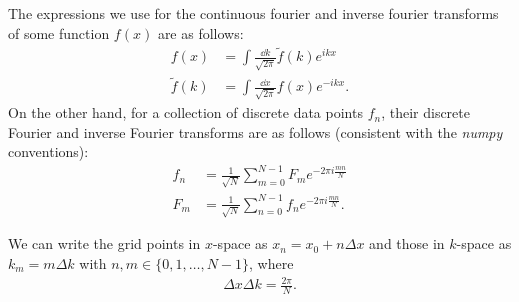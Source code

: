 The expressions we use for the continuous fourier and inverse fourier transforms of some function $f(x)$ are as follows:
\begin{align}
    f(x) &= \int \frac{\dd{k}}{\sqrt{2 \pi}} \tilde{f}(k) e^{i k x} \\
    \tilde{f}(k) &= \int \frac{\dd{x}}{\sqrt{2 \pi}} f(x) e^{-ikx}
.\end{align}
On the other hand, for a collection of discrete data points $f_{n}$, their discrete Fourier and inverse Fourier transforms are as follows (consistent with the \textit{numpy} conventions):
\begin{align}
    f_{n} &= \frac{1}{\sqrt{N}} \sum_{m=0}^{N-1} F_{m} e^{-2 \pi i \frac{m n}{N}} \\
    F_{m} &= \frac{1}{\sqrt{N}} \sum_{n=0}^{N-1} f_{n} e^{-2 \pi i \frac{m n}{N}}
.\end{align}

We can write the grid points in $x$-space as $x_{n} = x_0 + n \Delta x$ and those in $k$-space as $k_{m} = m \Delta k$ with $n,m \in \{ 0,1,\ldots,N-1 \}$, where
\begin{align}
    \Delta x \Delta k = \frac{2 \pi}{N}
.\end{align}


    


